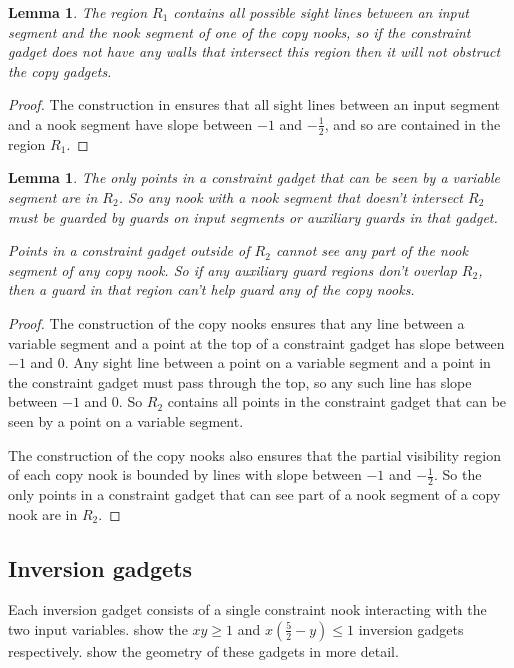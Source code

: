 \documentclass[11pt]{article}
\theoremstyle{plain}
\newtheorem{lemma}[theorem]{Lemma}
\theoremstyle{definition}
\numberwithin{theorem}{section}
\begin{document}
\begin{lemma}\label{lem:Region1}
The region $R_1$ contains all possible sight lines between an input segment and the nook segment of one of the copy nooks, so if the constraint gadget does not have any walls that intersect this region then it will not obstruct the copy gadgets. 
\end{lemma}

\begin{proof}
The construction in  ensures that all sight lines between an input segment and a nook segment have slope between $-1$ and $-\frac12$, and so are contained in the region $R_1$.
\end{proof}

\begin{lemma}\label{lem:Region2}
The only points in a constraint gadget that can be seen by a variable segment are in $R_2$. So any nook with a nook segment that doesn't intersect $R_2$ must be guarded by guards on input segments or auxiliary guards in that gadget.

Points in a constraint gadget outside of $R_2$ cannot see any part of the nook segment of any copy nook. So if any auxiliary guard regions don't overlap $R_2$, then a guard in that region can't help guard any of the copy nooks. 
\end{lemma}

\begin{proof}
The construction of the copy nooks ensures that any line between a variable segment and a point at the top of a constraint gadget has slope between $-1$ and $0$. Any sight line between a point on a variable segment and a point in the constraint gadget must pass through the top, so any such line has slope between $-1$ and $0$. So $R_2$ contains all points in the constraint gadget that can be seen by a point on a variable segment.

The construction of the copy nooks also ensures that the partial visibility region of each copy nook is bounded by lines with slope between $-1$ and $-\frac12$. So the only points in a constraint gadget that can see part of a nook segment of a copy nook are in $R_2$.
\end{proof}

\subsection{Inversion gadgets}\label{sec:InversionVerification}

Each inversion gadget consists of a single constraint nook interacting with the two input variables.  show the $xy\ge 1$ and $x\left(\frac{5}2-y\right)\le 1$ inversion gadgets respectively.  show the geometry of these gadgets in more detail.
\end{document}
